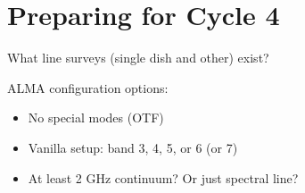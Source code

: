 \section{Preparing for Cycle 4}

What line surveys (single dish and other) exist?




ALMA configuration options:

\begin{itemize}
    \item No special modes (OTF)
    \item Vanilla setup: band 3, 4, 5, or 6 (or 7)
    \item At least 2 GHz continuum?  Or just spectral line?
\end{itemize}